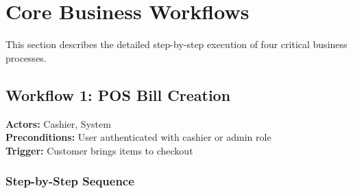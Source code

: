\section{Core Business Workflows}

This section describes the detailed step-by-step execution of four critical business processes.

\subsection{Workflow 1: POS Bill Creation}

\textbf{Actors:} Cashier, System\\
\textbf{Preconditions:} User authenticated with cashier or admin role\\
\textbf{Trigger:} Customer brings items to checkout

\subsubsection{Step-by-Step Sequence}

